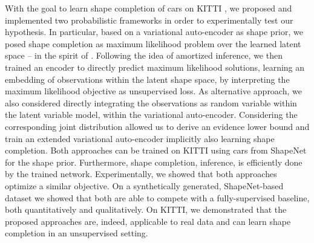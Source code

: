 With the goal to learn shape completion of cars on KITTI
\cite{GeigerLenzUrtasun:2012,GeigerLenzStillerUrtasun:2013}, we proposed
and implemented two probabilistic frameworks in order to experimentally
test our hypothesis. In particular, based on a variational auto-encoder
as shape prior, we posed shape completion as maximum likelihood problem
over the learned latent space -- in the spirit of \eg \cite{EngelmannStuecklerLeibe:2016}.
Following the idea of amortized inference, we 
then trained an encoder to directly predict maximum likelihood solutions,
\ie learning an embedding of observations within the latent shape space,
by interpreting the maximum likelihood objective as unsupervised loss.
As alternative approach, we also considered directly integrating the observations
as random variable within the latent variable model, \ie within the
variational auto-encoder. Considering the corresponding joint distribution
allowed us to derive an evidence lower bound and train an extended variational
auto-encoder implicitly also learning shape completion. Both approaches
can be trained on KITTI using cars from ShapeNet
\cite{ChangFunkhouserGuibasSavarese:2015} for the shape prior. Furthermore,
shape completion, \ie inference, is efficiently done by the trained network.
Experimentally, we showed that both approaches optimize a similar objective.
On a synthetically generated, ShapeNet-based dataset we showed that both
are able to compete with a fully-supervised baseline, both quantitatively and
qualitatively. On KITTI, we demonstrated that the proposed approaches are,
indeed, applicable to real data and can learn shape completion in an 
unsupervised setting.



